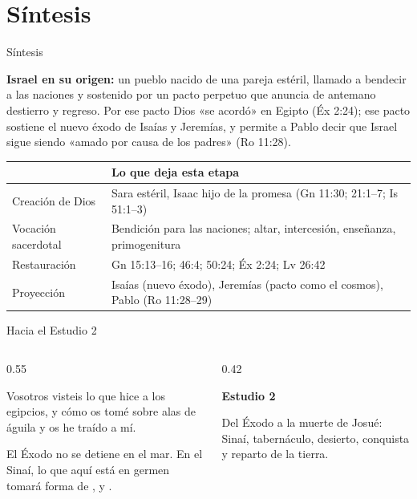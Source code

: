 \section{Síntesis}
\begin{frame}{Síntesis}
\begin{tcolorbox}[colback=piedra,colframe=ladrillo,boxrule=1pt,arc=3pt,fontupper=\small]
\textbf{\textcolor{cafe}{Israel en su origen:}} un pueblo nacido de una pareja estéril, llamado a bendecir a las naciones y sostenido por un pacto perpetuo que anuncia de antemano destierro y regreso. Por ese pacto Dios «se acordó» en Egipto (Éx 2:24); ese pacto sostiene el nuevo éxodo de Isaías y Jeremías, y permite a Pablo decir que Israel sigue siendo «amado por causa de los padres» (Ro 11:28).
\end{tcolorbox}
\scriptsize\renewcommand{\arraystretch}{1.25}
\begin{tabular}{>{\RaggedRight\arraybackslash}p{3.0cm}>{\RaggedRight\arraybackslash}p{8.6cm}}
\toprule
{\leavevmode\color{ladrillo}\bfseries Eje} & {\leavevmode\color{ladrillo}\bfseries Lo que deja esta etapa}\\\midrule
Creación de Dios & Sara estéril, Isaac hijo de la promesa (Gn 11:30; 21:1--7; Is 51:1--3)\\
Vocación sacerdotal & Bendición para las naciones; altar, intercesión, enseñanza, primogenitura\\
Restauración & Gn 15:13--16; 46:4; 50:24; Éx 2:24; Lv 26:42\\
Proyección & Isaías (nuevo éxodo), Jeremías (pacto como el cosmos), Pablo (Ro 11:28--29)\\
\bottomrule
\end{tabular}
\elabpropia
\end{frame}

\begin{frame}{Hacia el Estudio 2}
\begin{columns}[c,onlytextwidth]
\begin{column}{0.55\textwidth}
\begin{cita}Vosotros visteis lo que hice a los egipcios, y cómo os tomé sobre alas de águila y os he traído a mí.\end{cita}
\small El Éxodo no se detiene en el mar. En el Sinaí, lo que aquí está en germen tomará forma de ,  y .
\end{column}
\begin{column}{0.42\textwidth}
\begin{tcolorbox}[colback=cafe,colframe=cafeosc,coltext=piedra,boxrule=0.8pt,arc=3pt,fontupper=\small]
\textbf{Estudio 2}\par\smallskip
Del Éxodo a la muerte de Josué: Sinaí, tabernáculo, desierto, conquista y reparto de la tierra.
\end{tcolorbox}
\end{column}
\end{columns}
\end{frame}

